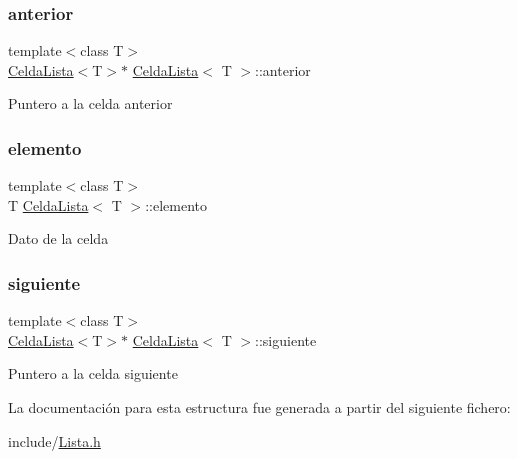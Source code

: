 \subsubsection{\texorpdfstring{anterior}{anterior}}
{\footnotesize\ttfamily template$<$class T$>$ \\
\mbox{\hyperlink{structCeldaLista}{Celda\+Lista}}$<$T$>$$\ast$ \mbox{\hyperlink{structCeldaLista}{Celda\+Lista}}$<$ T $>$\+::anterior}

Puntero a la celda anterior \mbox{\label{structCeldaLista_ac78124efe37c55079de99a201c5a1b20}} 
\subsubsection{\texorpdfstring{elemento}{elemento}}
{\footnotesize\ttfamily template$<$class T$>$ \\
T \mbox{\hyperlink{structCeldaLista}{Celda\+Lista}}$<$ T $>$\+::elemento}

Dato de la celda \mbox{\label{structCeldaLista_aa3ce281ab57ddb597fe19a667f651d6a}} 
\subsubsection{\texorpdfstring{siguiente}{siguiente}}
{\footnotesize\ttfamily template$<$class T$>$ \\
\mbox{\hyperlink{structCeldaLista}{Celda\+Lista}}$<$T$>$$\ast$ \mbox{\hyperlink{structCeldaLista}{Celda\+Lista}}$<$ T $>$\+::siguiente}

Puntero a la celda siguiente 

La documentación para esta estructura fue generada a partir del siguiente fichero\+:\begin{DoxyCompactItemize}
\item 
include/\mbox{\hyperlink{Lista_8h}{Lista.\+h}}\end{DoxyCompactItemize}
